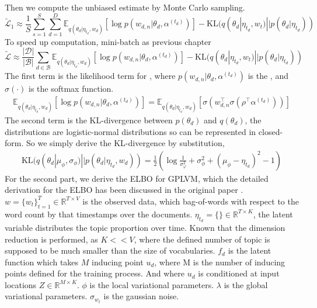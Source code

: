Then we compute the unbiased estimate by Monte Carlo sampling.
\begin{equation}
\tilde{\mathcal{L}}_{1}\approx\frac{1}{S}\sum_{s=1}^{S}\sum_{d=1}^{D}\mathbb{E}_{ q(\theta_d|\eta_{t_d},w_d)}[\log p(w_{d,n}|\theta_d,\alpha^{(t_d)})]-\text{KL}(q(\theta_d|\eta_{t_d},w_t)||p(\theta_d|\eta_{t_d}))
\end{equation}
To speed up computation, mini-batch as previous chapter
\begin{equation}
\tilde{\mathcal{L}}\approx\frac{|\mathcal{D}|}{|\mathcal{B}|}\sum_{d\in\mathcal{B}}\mathbb{E}_{ q(\theta_d|\eta_{t_d},w_d)}[\log p(w_{d,n}|\theta_d,\alpha^{(t_d)})]-\text{KL}(q(\theta_d|\eta_{t_d},w_t)||p(\theta_d|\eta_{t_d}))
\end{equation}
The first term is the likelihood term for , where $ p(w_{d,n}|\theta_d,\alpha^{(t_d)}) $ is the , and $ \sigma(\cdot) $ is the softmax function.
\begin{align}
\mathbb{E}_{ q(\theta_d|\eta_{t_d},w_d)}[\log p(w_{d,n}|\theta_d,\alpha^{(t_d)})]=\mathbb{E}_{ q(\theta_d|\eta_{t_d},w_d)}[\sigma(w_{d,n}^\top\sigma(\rho^\top\alpha^{(t_d)}))]
\end{align}
The second term is the KL-divergence between $ p(\theta_d) $ and $ q(\theta_d) $, the distributions are logistic-normal distributions so can be represented in closed-form. So we simply derive the KL-divergence by substitution,
\begin{align}\label{eq:ch5_kl_theta}
\text{KL}(q(\theta_d|\mu_\phi,\sigma_\phi)||p(\theta_d|\eta_{t_d},w_d))=\frac{1}{2}\left(\log\frac{1}{\sigma_\varphi^2}+\sigma_\phi^2+(\mu_\phi-\eta_{t_d})^2-1\right)
\end{align}
For the second part, we derive the ELBO for GPLVM, which the detailed derivation for the ELBO has been discussed in the original paper \cite{titsias_bayesian_nodate}. $ w=\{w_t\}^{T}_{t=1}\in\mathbb{R}^{T\times V} $ is the observed data, which bag-of-words with respect to the word count by that timestamps over the documents. $ \eta_{t_d}=\{\}\in\mathbb{R}^{T\times K} $, the latent variable distributes the topic proportion over time. Known that the dimension reduction is performed, as $ K<<V $, where the defined number of topic is supposed to be much smaller than the size of vocabularies.
$ f_d $ is the latent function which takes $ M $ inducing point $ u_d $, where M is the number of inducing points defined for the training process. And where $ u_d $ is conditioned at input locations $ Z\in\mathbb{R}^{M\times K} $. 
$ \phi $ is the local variational parameters. $ \lambda $ is the global variational parameters. $ \sigma_{w_t} $ is the gaussian noise.

